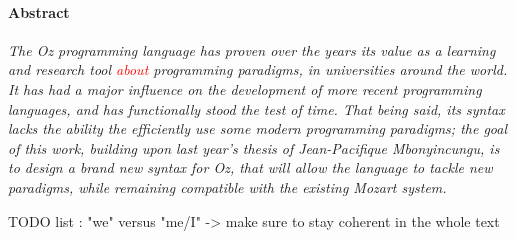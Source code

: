 
\paragraph{Abstract}
\textit{
The \textit{Oz} programming language has proven over the years its value as a learning and research tool \textcolor{red}{about} programming paradigms, in universities around the world.
It has had a major influence on the development of more recent programming languages, and has functionally stood the test of time.
That being said, its syntax lacks the ability the efficiently use some modern programming paradigms;
the goal of this work, building upon last year's thesis of Jean-Pacifique Mbonyincungu, is to design a brand new syntax for \textit{Oz}, that will allow the language to tackle new paradigms, while remaining compatible with the existing Mozart system.
}

TODO list :
"we" versus "me/I" -> make sure to stay coherent in the whole text
